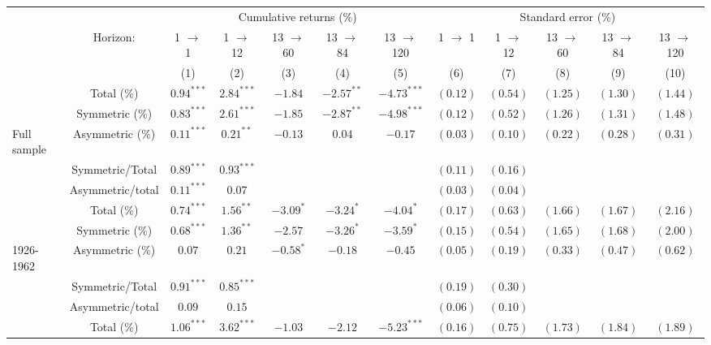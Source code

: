 \begin{tabular}{lccccccccccc}
   \toprule & & \multicolumn{5}{c}{Cumulative returns (\%)} & \multicolumn{5}{c}{Standard error (\%)} \\
 \cmidrule(l){2-7} \cmidrule(l){8-12} & Horizon: & 1 $\rightarrow$ 1 & 1 $\rightarrow$ 12 & 13 $\rightarrow$ 60 & 13 $\rightarrow$ 84 & 13 $\rightarrow$ 120 & 1 $\rightarrow$ 1 & 1 $\rightarrow$ 12 & 13 $\rightarrow$ 60 & 13 $\rightarrow$ 84 & 13 $\rightarrow$ 120 \\ 
   \cmidrule(l){3-7} \cmidrule(l){8-12} \vspace{5pt} &  & (1) & (2) & (3) & (4) & (5) & (6) & (7) & (8) & (9) & (10) \\ 
   & Total (\%) & $0.94^{***}$ & $2.84^{***}$ & $-1.84$ & $-2.57^{**}$ & $-4.73^{***}$ & $(0.12)$ & $(0.54)$ & $(1.25)$ & $(1.30)$ & $(1.44)$ \\ 
   & Symmetric (\%) & $0.83^{***}$ & $2.61^{***}$ & $-1.85$ & $-2.87^{**}$ & $-4.98^{***}$ & $(0.12)$ & $(0.52)$ & $(1.26)$ & $(1.31)$ & $(1.48)$ \\ 
   \vspace{5pt}Full sample & Asymmetric (\%) & $0.11^{***}$ & $0.21^{**}$ & $-0.13$ & $0.04$ & $-0.17$ & $(0.03)$ & $(0.10)$ & $(0.22)$ & $(0.28)$ & $(0.31)$ \\ 
   & Symmetric/Total & $0.89^{***}$ & $0.93^{***}$ &  &  &  & $(0.11)$ & $(0.16)$ &  &  &  \\ 
   \vspace{5pt} & Asymmetric/total & $0.11^{***}$ & $0.07$ &  &  &  & $(0.03)$ & $(0.04)$ &  &  &  \\ 
   \hline & Total (\%) & $0.74^{***}$ & $1.56^{**}$ & $-3.09^{*}$ & $-3.24^{*}$ & $-4.04^{*}$ & $(0.17)$ & $(0.63)$ & $(1.66)$ & $(1.67)$ & $(2.16)$ \\ 
   & Symmetric (\%) & $0.68^{***}$ & $1.36^{**}$ & $-2.57$ & $-3.26^{*}$ & $-3.59^{*}$ & $(0.15)$ & $(0.54)$ & $(1.65)$ & $(1.68)$ & $(2.00)$ \\ 
   \vspace{5pt}1926-1962 & Asymmetric (\%) & $0.07$ & $0.21$ & $-0.58^{*}$ & $-0.18$ & $-0.45$ & $(0.05)$ & $(0.19)$ & $(0.33)$ & $(0.47)$ & $(0.62)$ \\ 
   & Symmetric/Total & $0.91^{***}$ & $0.85^{***}$ &  &  &  & $(0.19)$ & $(0.30)$ &  &  &  \\ 
   \vspace{5pt} & Asymmetric/total & $0.09$ & $0.15$ &  &  &  & $(0.06)$ & $(0.10)$ &  &  &  \\ 
   \hline & Total (\%) & $1.06^{***}$ & $3.62^{***}$ & $-1.03$ & $-2.12$ & $-5.23^{***}$ & $(0.16)$ & $(0.75)$ & $(1.73)$ & $(1.84)$ & $(1.89)$ \\ 

\end{tabular}
